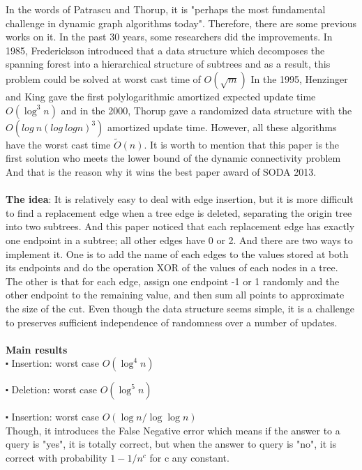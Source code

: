\documentclass[conference,compsoc]{IEEEtran}
\begin{document}
In the words of Patrascu and Thorup, it is "perhaps the most fundamental challenge in dynamic graph algorithms today".  Therefore, there are some previous works on it. In the past 30 years, some researchers did the improvements. In 1985, Frederickson introduced that a data structure which decomposes the spanning forest into a hierarchical structure of subtrees and as a result, this problem could be solved at worst cast time of $O(\sqrt m)$ 
In the 1995, Henzinger and King gave the first polylogarithmic amortized expected update time $O(\log^3 n)$ and in the 2000, Thorup gave a randomized data structure with the $O(log\ n(log \ log n)^3)$ amortized update time. However, all these algorithms have the worst cast time $\tilde{O} (n)$.
It is worth to mention that this paper is the first solution who meets the lower bound of the dynamic connectivity problem And that is the reason why it wins the best paper award of SODA 2013.
\\
\\
\textbf{The idea}: 
It is relatively easy to deal with edge insertion, but it is more difficult to find a replacement edge when a tree edge is deleted, separating the origin tree into two subtrees. And this paper noticed that each replacement edge has exactly one endpoint in a subtree; all other edges have 0 or 2. And there are two ways to implement it. One is to add the name of each edges to the values stored at both its endpoints and do the operation XOR of the values of each nodes in a tree. The other is that for each edge, assign one endpoint -1 or 1 randomly and the other endpoint to the remaining value, and then sum all points to approximate the size of the cut. Even though the data structure seems simple, it is a challenge to preserves sufficient independence of randomness over a number of updates.
\\
\\
\textbf{Main results}\\

$\centerdot$  Insertion: worst case $O(\log^4n)$

$\centerdot$  Deletion: worst case $O(\log^5n)$

$\centerdot$  Insertion: worst case $O(\log n/\log\log n)$\\

Though, it introduces the False Negative error which means if the answer to a query is "yes", it is totally correct, but when the answer to query is "no", it is correct with probability $1-1/n^c$ for c any constant.
\end{document}
